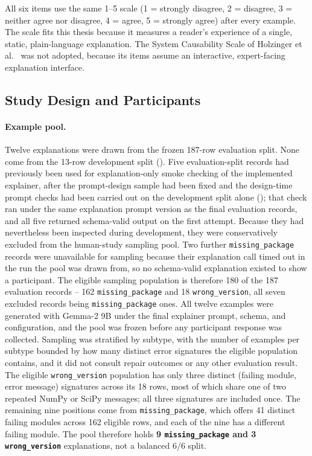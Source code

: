 All six items use the same 1--5 scale (1 = strongly disagree, 2 =
disagree, 3 = neither agree nor disagree, 4 = agree, 5 = strongly agree)
after every example. The scale fits this thesis because it measures a
reader's experience of a single, static, plain-language explanation. The
System Causability Scale of Holzinger et al.~\cite{holzinger2020scs} was
not adopted, because its items assume an interactive, expert-facing
explanation interface.

\subsection{Study Design and Participants}
\label{sec:v-human-eval-pool}

\paragraph{Example pool.} Twelve explanations were drawn from the frozen
187-row evaluation split. None come from the 13-row development split
(). Five evaluation-split records had
previously been used for explanation-only smoke checking of the
implemented explainer, after the prompt-design sample had been fixed and
the design-time prompt checks had been carried out on the development
split alone (); that check ran under the same explanation
prompt version as the final evaluation records, and all five returned
schema-valid output on the first attempt. Because they had nevertheless
been inspected during development, they were conservatively excluded from
the human-study sampling pool. Two further
\texttt{missing\_package} records were unavailable for sampling because
their explanation call timed out in the run the pool was drawn from, so
no schema-valid explanation existed to show a participant. The eligible
sampling population is therefore 180 of the 187 evaluation records --
162 \texttt{missing\_package} and 18 \texttt{wrong\_version}, all seven
excluded records being \texttt{missing\_package} ones. All twelve
examples were generated with Gemma-2 9B under the final explainer prompt,
schema, and configuration, and the pool was frozen before any participant
response was collected. Sampling was stratified by subtype, with the
number of examples per subtype bounded by how many distinct error
signatures the eligible population contains, and it did not consult
repair outcomes or any other evaluation result. The eligible
\texttt{wrong\_version} population has only three distinct (failing
module, error message) signatures across its 18 rows, most of which share
one of two repeated NumPy or SciPy messages; all three signatures are
included once. The remaining nine positions come from
\texttt{missing\_package}, which offers 41 distinct failing modules
across 162 eligible rows, and each of the nine has a different failing
module. The pool therefore holds \textbf{9 \texttt{missing\_package} and
3 \texttt{wrong\_version}} explanations, not a balanced 6/6 split.

